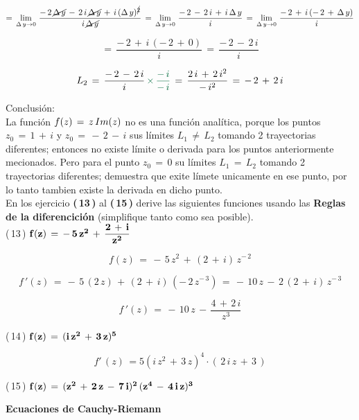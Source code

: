\documentclass[a4paper,11pt,openany]{book}
\begin{document}
$$=\,\displaystyle\lim_{\Delta\,y \to 0}\,\dfrac{-\,2\,\cancel{\Delta\,y}\,-\,2\,i\,\cancel{\Delta\,y}\,+\,i\,(\Delta\,y)^{\cancel{2}}}{i\,\cancel{\Delta\,y}}\,=\,\displaystyle\lim_{\Delta\,y \to 0}\,\dfrac{-\,2\,-\,2\,i\,+\,i\,\Delta\,y}{i}\,=\,\displaystyle\lim_{\Delta\,y \to 0}\,\dfrac{-\,2\,+\,i\,(-\,2\,+\,\Delta\,y)}{i}$$

$$=\,\dfrac{-\,2\,+\,i\,(-\,2\,+\,0)}{i}\,=\,\dfrac{-\,2\,-\,2\,i}{i}$$

$$L_{2}\,=\,\dfrac{-\,2\,-\,2\,i}{i}\,\textcolor{cadmiumgreen}{\times\,\dfrac{-\,i}{-\,i}}\,=\,\dfrac{2\,i\,+\,2\,i^{2}}{-\,i^{2}}\,=\,-\,2\,+\,2\,i$$

\textcolor{ao(english)}{} Conclusión:\\

La función $f(z)\,=\,z\,\mathnormal{Im}(z)$ no es una función analítica, porque los puntos $z_{0}\,=\,1\,+\,i$ y $z_{0}\,=\,-\,2\,-\,i$ sus límites $L_{1}\,\neq\,L_{2}$ tomando 2 trayectorias diferentes; entonces no existe límite o derivada para los puntos anteriormente mecionados. Pero para el punto $z_{0}\,=\,0$ su límites $L_{1}\,=\,L_{2}$ tomando 2 trayectorias diferentes; demuestra que exite límete unicamente en ese punto, por lo tanto tambien existe la derivada en dicho punto.\\

En los ejercicio \textbf{(\,13\,)} al \textbf{(\,15\,)} derive las siguientes funciones usando las \textbf{Reglas de la diferencición} (simplifique tanto como sea posible).\\

\textcolor{ao(english)}{(\,13\,)} $\bf{f(z)\,=\,-\,5\,z^{2}\,+\,\dfrac{2\,+\,i}{z^{2}}}$

$$f(z)\,=\,-\,5\,z^{2}\,+\,(2\,+\,i)\,z^{-\,2}$$

$$f\,'(z)\,=\,-\,5\,(2\,z)\,+\,(2\,+\,i)\,(-\,2\,z^{-\,3})\,=\,-\,10\,z\,-\,2\,(2\,+\,i)\,z^{-\,3}$$

$$f\,'(z)\,=\,-\,10\,z\,-\,\dfrac{4\,+\,2\,i}{z^{3}}$$

\textcolor{ao(english)}{(\,14\,)} $\bf{f(z)\,=\,(i\,z^{2}\,+\,3\,z)^{5}}$

$$ \boxed{f'\,(z)\,= 5(i\,z^{2}\,+\,3\,z)^{4} \cdot (\,2\,i\,z\,+\,3\,)} $$

\textcolor{ao(english)}{(\,15\,)} $\bf{f(z)\,=\,(z^{2}\,+\,2\,z\,-\,7\,i)^{2}\,(z^{4}\,-\,4\,i\,z)^{3}}$

\begin{center}
\textbf{Ecuaciones de Cauchy-Riemann}
\end{center}
\end{document}
